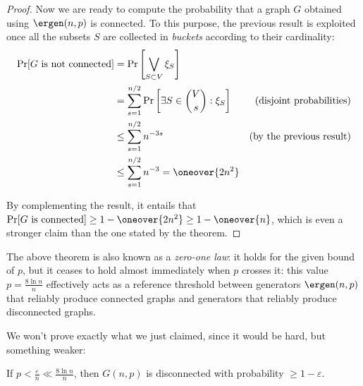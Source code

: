 \begin{proof}
    Now we are ready to compute the probability that a graph $G$ obtained using $\ergen(n, p)$ is connected. To this purpose, the previous result is exploited once all the subsets $S$ are collected in \emph{buckets} according to their cardinality:
    \begin{align*}
        \Pr[G \text{ is not connected}] &= \Pr\left[\bigvee_{S \subset V} \xi_S\right]  & \\
        &= \sum_{s = 1}^{n/2}\Pr\left[\exists S \in \binom{V}{s} : \xi_S\right]         & \text{(disjoint probabilities)} \\
        &\leq \sum_{s = 1}^{n/2} n^{-3s}                                                & \text{(by the previous result)} \\
        &\leq \sum_{s = 1}^{n/2} n^{-3} = \oneover{2n^2}                                &
    \end{align*}
    
   By complementing the result, it entails that $\Pr[G \text{ is connected}] \geq 1 - \oneover{2n^2} \geq 1 - \oneover{n}$, which is even a stronger claim than the one stated by the theorem.
\end{proof}

The above theorem is also known as a \emph{zero-one law}: it holds for the given bound of $p$, but it ceases to hold almost immediately when $p$ crosses it: this value $p = \frac{8 \ln n}{n}$ effectively acts as a reference threshold between generators $\ergen(n, p)$ that reliably produce connected graphs and generators that reliably produce disconnected graphs.

We won't prove exactly what we just claimed, since it would be hard, but something weaker:
\begin{theorem}
    If $p < \frac{\varepsilon}{n} \ll \frac{8 \ln n}{n}$, then $G(n, p)$ is disconnected with probability $\geq 1 - \varepsilon$.
\end{theorem}

